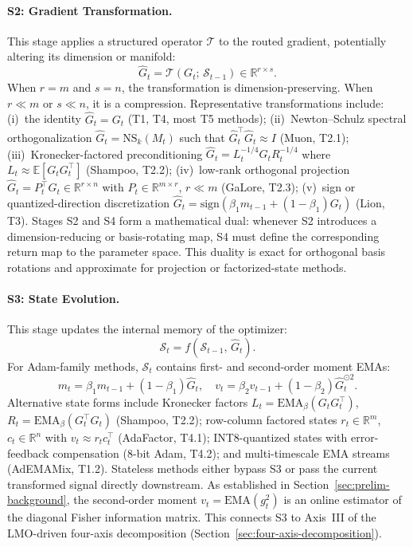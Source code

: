 \paragraph{S2: Gradient Transformation.}
This stage applies a structured operator $\mathcal{T}$ to the routed gradient,
potentially altering its dimension or manifold:
\begin{equation}
  \hat{G}_t = \mathcal{T}\!\left(G_t;\,\mathcal{S}_{t-1}\right)
  \in \mathbb{R}^{r\times s}.
  \label{eq:s2}
\end{equation}
When $r=m$ and $s=n$, the transformation is dimension-preserving.  When
$r\ll m$ or $s\ll n$, it is a compression.  Representative transformations
include:
(i)~the identity $\hat{G}_t = G_t$ (T1, T4, most T5 methods);
(ii)~Newton--Schulz spectral orthogonalization
$\hat{G}_t = \mathrm{NS}_k(M_t)$ such that $\hat{G}_t^\top\hat{G}_t\approx I$
(Muon, T2.1);
(iii)~Kronecker-factored preconditioning
$\hat{G}_t = L_t^{-1/4}G_tR_t^{-1/4}$ where
$L_t\approx\mathbb{E}[G_tG_t^\top]$ (Shampoo, T2.2);
(iv)~low-rank orthogonal projection
$\hat{G}_t = P_t^\top G_t\in\mathbb{R}^{r\times n}$ with
$P_t\in\mathbb{R}^{m\times r}$, $r\ll m$ (GaLore, T2.3);
(v)~sign or quantized-direction discretization
$\hat{G}_t = \mathrm{sign}(\beta_1 m_{t-1}+(1-\beta_1)G_t)$
(Lion, T3).
Stages S2 and S4 form a mathematical dual: whenever S2 introduces a
dimension-reducing or basis-rotating map, S4 must define the corresponding
return map to the parameter space.  This duality is exact for orthogonal basis
rotations and approximate for projection or factorized-state methods.

\paragraph{S3: State Evolution.}
This stage updates the internal memory of the optimizer:
\begin{equation}
  \mathcal{S}_t = f\!\left(\mathcal{S}_{t-1},\,\hat{G}_t\right).
  \label{eq:s3}
\end{equation}
For Adam-family methods, $\mathcal{S}_t$ contains first- and second-order
moment EMAs:
\begin{equation}
  m_t = \beta_1 m_{t-1}+(1-\beta_1)\hat{G}_t, \quad
  v_t = \beta_2 v_{t-1}+(1-\beta_2)\hat{G}_t^{\odot 2}.
  \label{eq:adam-state}
\end{equation}
Alternative state forms include Kronecker factors
$L_t=\mathrm{EMA}_\beta(G_tG_t^\top)$,
$R_t=\mathrm{EMA}_\beta(G_t^\top G_t)$ (Shampoo, T2.2); row-column factored
states $r_t\in\mathbb{R}^m$, $c_t\in\mathbb{R}^n$ with
$v_t\approx r_t c_t^\top$ (AdaFactor, T4.1); INT8-quantized states with
error-feedback compensation (8-bit Adam, T4.2); and multi-timescale EMA
streams (AdEMAMix, T1.2).  Stateless methods either bypass S3 or pass the
current transformed signal directly downstream.
As established in Section~\ref{sec:prelim-background}, the second-order moment
$v_t=\mathrm{EMA}(g_t^2)$ is an online estimator of the diagonal Fisher
information matrix.  This connects S3 to Axis~III of the LMO-driven four-axis
decomposition (Section~\ref{sec:four-axis-decomposition}).


